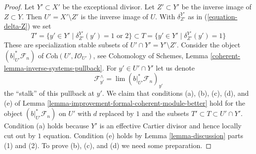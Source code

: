 \begin{proof}
Let $Y' \subset X'$ be the exceptional divisor.
Let $Z' \subset Y'$ be the inverse image of $Z \subset Y$.
Then $U' = X' \setminus Z'$ is the inverse image of $U$.
With $\delta^{Y'}_{Z'}$ as in (\ref{equation-delta-Z}) we set
$$
T' = \{y' \in Y' \mid \delta^{Y'}_{Z'}(y') = 1\text{ or }2\}
\subset
T = \{y' \in Y' \mid \delta^{Y'}_{Z'}(y') = 1\}
$$
These are specialization stable subsets of
$U' \cap Y' = Y' \setminus Z'$. Consider the
object $(b|_{U'}^*\mathcal{F}_n)$ of $\textit{Coh}(U', I\mathcal{O}_{U'})$,
see Cohomology of Schemes, Lemma \ref{coherent-lemma-inverse-systems-pullback}.
For $y' \in U' \cap Y'$ let us denote
$$
\mathcal{F}_{y'}^\wedge = \lim (b|_{U'}^*\mathcal{F}_n)_{y'}
$$
the ``stalk'' of this pullback at $y'$. We claim that conditions
(a), (b), (c), (d), and (e) of
Lemma \ref{lemma-improvement-formal-coherent-module-better}
hold for the object $(b|_{U'}^*\mathcal{F}_n)$ on $U'$ with $d$
replaced by $1$ and the subsets $T' \subset T \subset U' \cap Y'$.
Condition (a) holds because $Y'$ is an effective Cartier divisor
and hence locally cut out by $1$ equation. Condition (e) holds
by Lemma \ref{lemma-discussion} parts (1) and (2).
To prove (b), (c), and (d) we need some preparation.


\end{proof}
